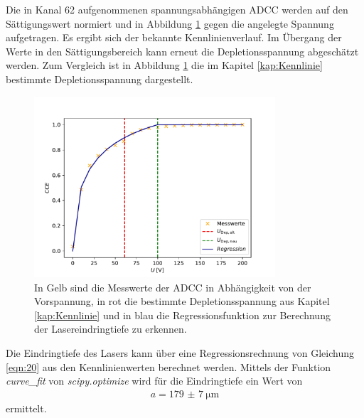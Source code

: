 Die in Kanal 62 aufgenommenen spannungsabhängigen ADCC werden auf den Sättigungswert normiert und in Abbildung \ref{fig:KennlinieLaser} gegen die angelegte Spannung aufgetragen. Es ergibt sich der bekannte Kennlinienverlauf. Im Übergang der Werte in den Sättigungsbereich kann erneut die Depletionsspannung abgeschätzt werden. Zum Vergleich ist in Abbildung \ref{fig:KennlinieLaser} die im Kapitel \ref{kap:Kennlinie} bestimmte Depletionsspannung dargestellt.
\begin{figure}
  \centering
  \includegraphics[width=0.8\textwidth]{plots/Kennlinie_Laser.pdf}
  \caption{In Gelb sind die Messwerte der ADCC in Abhängigkeit von der Vorspannung, in rot die bestimmte Depletionsspannung aus Kapitel \ref{kap:Kennlinie} und in blau die Regressionsfunktion zur Berechnung der Lasereindringtiefe zu erkennen.}
  \label{fig:KennlinieLaser}
\end{figure}
\FloatBarrier
Die Eindringtiefe des Lasers kann über eine Regressionsrechnung von Gleichung \eqref{eqn:20} aus den Kennlinienwerten berechnet werden. Mittels der Funktion \textit{curve\_fit} von \textit{scipy.optimize} \cite{scipy} wird für die Eindringtiefe ein Wert von
\begin{align*}
   a= \SI{179(7)}{\micro\metre}
\end{align*}
ermittelt.

